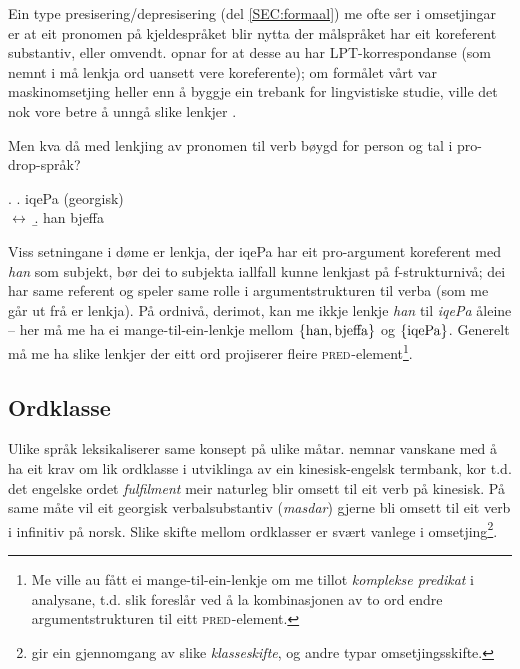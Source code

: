 \documentclass[11pt,a4paper,oneside,draft]{report}
\newcommand{\F}[2]{\textsc{#1}\ensuremath{_{#2}}}
\newcommand{\PRED}{\F{pred}{}}
\begin{document}
 
Ein type presisering/depresisering (del \ref{SEC:formaal}) me ofte ser
i omsetjingar er at eit pronomen på kjeldespråket blir nytta der
målspråket har eit koreferent substantiv, eller
omvendt. \citet{dyvik2009lmp} opnar for at desse au har
LPT-korrespondanse (som nemnt i \cite{thunes2003eal} må lenkja ord
uansett vere koreferente); om formålet vårt var maskinomsetjing heller
enn å byggje ein trebank for lingvistiske studie, ville det nok vore
betre å unngå slike lenkjer \citep[s.~53]{volk2008hjp}.

Men kva då med lenkjing av pronomen til verb bøygd for person og tal i
pro-drop-språk?

\ex. \a. iqePa                                  \hfill{} (georgisk) \\
     $\leftrightarrow$
     \b. han bjeffa

Viss setningane i døme \Last er lenkja, der iqePa har eit pro-argument
koreferent med \emph{han} som subjekt, bør dei to subjekta iallfall kunne
lenkjast på f-strukturnivå; dei har same referent og speler same rolle
i argumentstrukturen til verba (som me går ut frå er lenkja). På
ordnivå, derimot, kan me ikkje lenkje \emph{han} til \emph{iqePa} åleine -- her
må me ha ei mange-til-ein-lenkje mellom $\{ \rm han, bjeffa \}$ og $\{
\rm iqePa \}$. 
Generelt må me ha slike lenkjer der eitt ord projiserer fleire
\PRED{}-element\footnote{Me ville au fått ei mange-til-ein-lenkje om me tillot
        \emph{komplekse predikat} i analysane, t.d. slik
        \citet{butt1998merger} foreslår ved å la kombinasjonen av to
        ord endre argumentstrukturen til eitt \PRED{}-element. }.

\subsection{Ordklasse}
\label{sec-3.5.1}

Ulike språk leksikaliserer same konsept på ulike
måtar. \citet[s.~3]{cheung2002scg} nemnar vanskane med å ha eit krav
om lik ordklasse i utviklinga av ein kinesisk-engelsk termbank, kor
t.d. det engelske ordet \emph{fulfilment} meir naturleg blir omsett til eit
verb på kinesisk. På same måte vil eit georgisk verbalsubstantiv
(\emph{masdar}) gjerne bli omsett til eit verb i infinitiv på
norsk. Slike skifte mellom ordklasser er svært vanlege i
omsetjing\footnote{\citet[Catford~(1965),~i][s.~61]{munday2001its} gir ein gjennomgang av
       slike \emph{klasseskifte}, og andre typar omsetjingsskifte. }.
\end{document}
